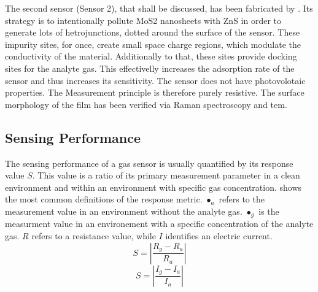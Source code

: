 The second sensor (Sensor 2), that shall be discussed, has been fabricated by \cite{Liu2021}. Its strategy is to intentionally pollute MoS2 nanosheets with ZnS in order to generate lots of hetrojunctions, dotted around the surface of the sensor. These impurity sites, for once, create small space charge regions, which modulate the conductivity of the material. Additionally to that, these sites provide docking sites for the analyte gas. This effectivelly increases the adsorption rate of the sensor and thus increases its sensitivity. The sensor does not have photovolotaic properties. The Measurement principle is therefore purely resistive. The surface morphology of the film has been verified via Raman spectroscopy and \gls{tem}.\\
\subsection{Sensing Performance}
The sensing performance of a gas sensor is usually quantified by its response value $S$. This value is a ratio of its primary measurement parameter in a clean environment and within an environment with specific gas concentration.  shows the most common definitions of the response metric. $\bullet_a$ refers to the measurement value in an environment without the analyte gas. $\bullet_g$ is the measurment value in an environement with a specific concentration of the analyte gas. $R$ refers to a resistance value, while $I$ identifies an electric current.
\begin{equation}
\label{eqn:respone_1}
    S = |\frac{R_g-R_a}{R_a}|
\end{equation}
\begin{equation}
\label{eqn:respone_2}
    S = |\frac{I_g-I_a}{I_a}|
\end{equation}

